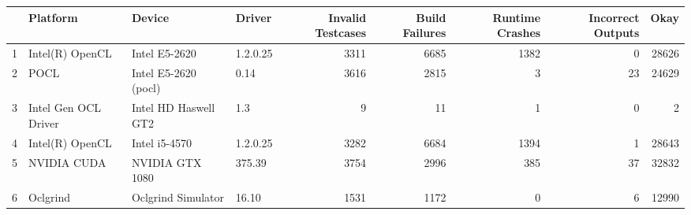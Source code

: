 \begin{tabular}{llllrrrrr}
\toprule
{} &              Platform &                Device &    Driver &  Invalid Testcases &  Build Failures &  Runtime Crashes &  Incorrect Outputs &   Okay \\
\midrule
1 &       Intel(R) OpenCL &         Intel E5-2620 &  1.2.0.25 &               3311 &            6685 &             1382 &                  0 &  28626 \\
2 &                  POCL &  Intel E5-2620 (pocl) &      0.14 &               3616 &            2815 &                3 &                 23 &  24629 \\
3 &  Intel Gen OCL Driver &  Intel HD Haswell GT2 &       1.3 &                  9 &              11 &                1 &                  0 &      2 \\
4 &       Intel(R) OpenCL &         Intel i5-4570 &  1.2.0.25 &               3282 &            6684 &             1394 &                  1 &  28643 \\
5 &           NVIDIA CUDA &       NVIDIA GTX 1080 &    375.39 &               3754 &            2996 &              385 &                 37 &  32832 \\
6 &              Oclgrind &    Oclgrind Simulator &     16.10 &               1531 &            1172 &                0 &                  6 &  12990 \\
\bottomrule
\end{tabular}
